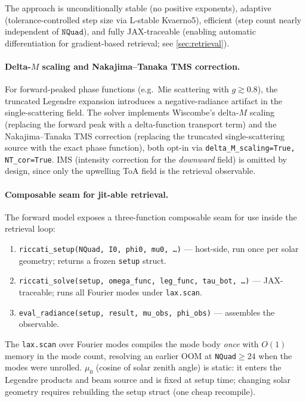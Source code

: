 \documentclass[11pt,a4paper]{article}
\theoremstyle{definition}
\begin{document}
The approach is unconditionally stable (no positive exponents),
adaptive (tolerance-controlled step size via L-stable Kvaerno5),
efficient (step count nearly independent of $\texttt{NQuad}$), and
fully JAX-traceable (enabling automatic differentiation for
gradient-based retrieval; see \cref{sec:retrieval}).

\paragraph{Delta-$M$ scaling and Nakajima--Tanaka TMS correction.}
For forward-peaked phase functions (e.g.\ Mie scattering with
$g\!\gtrsim\!0.8$), the truncated Legendre expansion introduces a
negative-radiance artifact in the single-scattering field.  The solver
implements Wiscombe's delta-$M$ scaling~\cite{Wiscombe1977} (replacing
the forward peak with a delta-function transport term) and the
Nakajima--Tanaka TMS correction (replacing the truncated
single-scattering source with the exact phase function), both opt-in via
\texttt{delta\_M\_scaling=True, NT\_cor=True}.  IMS (intensity correction
for the \emph{downward} field) is omitted by design, since only the
upwelling ToA field is the retrieval observable.

\paragraph{Composable seam for jit-able retrieval.}
The forward model exposes a three-function composable seam for use inside
the retrieval loop:
\begin{enumerate}[nosep]
  \item \texttt{riccati\_setup(NQuad, I0, phi0, mu0, \ldots)}
    --- host-side, run once per solar geometry; returns a frozen
    \texttt{setup} struct.
  \item \texttt{riccati\_solve(setup, omega\_func, leg\_func, tau\_bot, \ldots)}
    --- JAX-traceable; runs all Fourier modes under \texttt{lax.scan}.
  \item \texttt{eval\_radiance(setup, result, mu\_obs, phi\_obs)}
    --- assembles the observable.
\end{enumerate}
The \texttt{lax.scan} over Fourier modes compiles the mode body
\emph{once} with $O(1)$ memory in the mode count, resolving an earlier
OOM at \texttt{NQuad}$\geq 24$ when the modes were unrolled.  $\mu_0$
(cosine of solar zenith angle) is static: it enters the Legendre
products and beam source and is fixed at setup time; changing solar
geometry requires rebuilding the setup struct (one cheap recompile).
\end{document}

